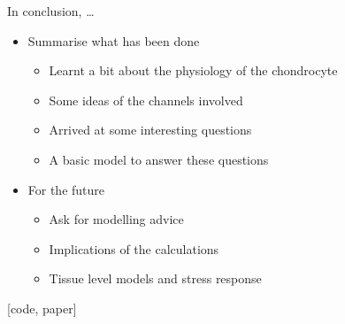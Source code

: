 \documentclass[ignorenonframetext]{beamer}
\newcommand{\references}[1] {
  \begin{flushright}
    \scriptsize [#1] \normalsize
  \end{flushright}
}
\begin{document}

\begin{frame}{In conclusion, \ldots}

  \begin{itemize}
  \item Summarise what has been done
    \begin{itemize}
      \item Learnt a bit about the physiology of the chondrocyte
      \item Some ideas of the channels involved
      \item Arrived at some interesting questions
      \item A basic model to answer these questions
    \end{itemize}
  \item For the future
    \begin{itemize}
    \item Ask for modelling advice
    \item Implications of the calculations
    \item Tissue level models and stress response
    \end{itemize}
  \end{itemize}

  \references{code, paper}

\end{frame}
\end{document}
